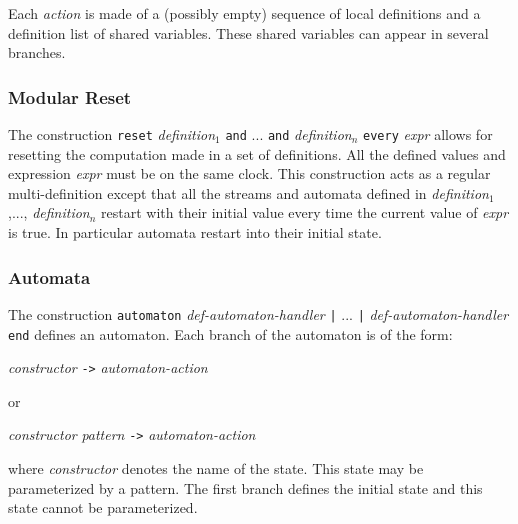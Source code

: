 \documentclass[11pt,titlepage,twoside]{report}
\newcommand{\And}{\mbox{{\tt and}}}
\newcommand{\Reset}{\mbox{{\tt reset}}}
\newcommand{\Every}{\mbox{{\tt every}}}
\newcommand{\term}[1]{{\tt #1}}
\newcommand{\nterm}[1]{{\em #1}}
\begin{document}
Each \nterm{action} is made of a (possibly empty) sequence of local
definitions and a definition list of shared variables. These shared
variables can appear in several branches.

\subsubsection{Modular Reset}
The construction \term{\Reset} \nterm{definition}$_1$ \term{\And} ...
\term{\And} \nterm{definition}$_n$ \term{\Every} \nterm{expr} allows
for resetting the computation made in a set of definitions. All the
defined values and expression \nterm{expr} must be on the same
clock. This construction acts as a regular multi-definition except
that all the streams and automata defined in
\nterm{definition}$_1$,..., \nterm{definition}$_n$ restart with their
initial value every time the current value of {\em expr} is true. In
particular automata restart into their initial state.

\subsubsection{Automata}
The construction \term{automaton} \nterm{def-automaton-handler} \term{|}
... \term{|} \nterm{def-automaton-handler} \term{end} defines an
automaton. Each branch of the automaton is of the form:
\begin{center} 
  \nterm{constructor} \term{->} \nterm{automaton-action}
\end{center}
or
\begin{center}
  \nterm{constructor} \nterm{pattern} \term{->} \nterm{automaton-action}
\end{center}
where \nterm{constructor} denotes the name of the state. This state
may be parameterized by a pattern.  The first branch defines the
initial state and this state cannot be parameterized.
\end{document}

